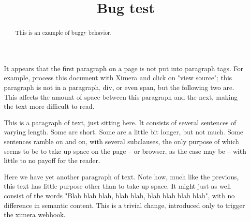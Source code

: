 \documentclass{ximera}
\title{Bug test}
\begin{document}
\begin{abstract}
This is an example of buggy behavior.
\end{abstract}
\maketitle

It appears that the first paragraph on a page is not put into paragraph tags. For example, process this document with Ximera and click on "view source"; this paragraph is not in a paragraph, div, or even span, but the following two are. This affects the amount of space between this paragraph and the next, making the text more difficult to read.

This is a paragraph of text, just sitting here. It consists of several sentences of varying length. Some are short. Some are a little bit longer, but not much. Some sentences ramble on and on, with several subclauses, the only purpose of which seems to be to take up space on the page -- or browser, as the case may be -- with little to no payoff for the reader.

Here we have yet another paragraph of text. Note how, much like the previous, this text has little purpose other than to take up space. It might just as well consist of the words "Blah blah blah, blah blah, blah blah blah blah", with no difference in semantic content. This is a trivial change, introduced only to trigger the ximera webhook.
\end{document}

